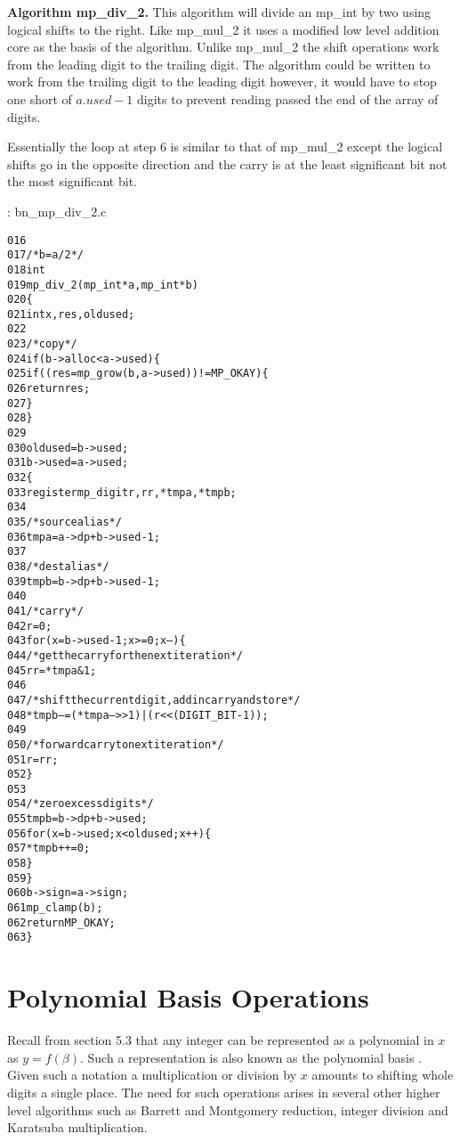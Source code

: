 \documentclass[b5paper]{book}
\begin{document}
\textbf{Algorithm mp\_div\_2.}
This algorithm will divide an mp\_int by two using logical shifts to the right.  Like mp\_mul\_2 it uses a modified low level addition
core as the basis of the algorithm.  Unlike mp\_mul\_2 the shift operations work from the leading digit to the trailing digit.  The algorithm
could be written to work from the trailing digit to the leading digit however, it would have to stop one short of $a.used - 1$ digits to prevent
reading passed the end of the array of digits.

Essentially the loop at step 6 is similar to that of mp\_mul\_2 except the logical shifts go in the opposite direction and the carry is at the 
least significant bit not the most significant bit.  

\vspace{+3mm}\begin{small}
\hspace{-5.1mm}{\bf File}: bn\_mp\_div\_2.c
\vspace{-3mm}
\begin{alltt}
016   
017   /* b = a/2 */
018   int
019   mp_div_2 (mp_int * a, mp_int * b)
020   \{
021     int     x, res, oldused;
022   
023     /* copy */
024     if (b->alloc < a->used) \{
025       if ((res = mp_grow (b, a->used)) != MP_OKAY) \{
026         return res;
027       \}
028     \}
029   
030     oldused = b->used;
031     b->used = a->used;
032     \{
033       register mp_digit r, rr, *tmpa, *tmpb;
034   
035       /* source alias */
036       tmpa = a->dp + b->used - 1;
037   
038       /* dest alias */
039       tmpb = b->dp + b->used - 1;
040   
041       /* carry */
042       r = 0;
043       for (x = b->used - 1; x >= 0; x--) \{
044         /* get the carry for the next iteration */
045         rr = *tmpa & 1;
046   
047         /* shift the current digit, add in carry and store */
048         *tmpb-- = (*tmpa-- >> 1) | (r << (DIGIT_BIT - 1));
049   
050         /* forward carry to next iteration */
051         r = rr;
052       \}
053   
054       /* zero excess digits */
055       tmpb = b->dp + b->used;
056       for (x = b->used; x < oldused; x++) \{
057         *tmpb++ = 0;
058       \}
059     \}
060     b->sign = a->sign;
061     mp_clamp (b);
062     return MP_OKAY;
063   \}
\end{alltt}
\end{small}

\section{Polynomial Basis Operations}
Recall from section 5.3 that any integer can be represented as a polynomial in $x$ as $y = f(\beta)$.  Such a representation is also known as
the polynomial basis \cite[pp. 48]{ROSE}. Given such a notation a multiplication or division by $x$ amounts to shifting whole digits a single 
place.  The need for such operations arises in several other higher level algorithms such as Barrett and Montgomery reduction, integer
division and Karatsuba multiplication.  
\end{document}
